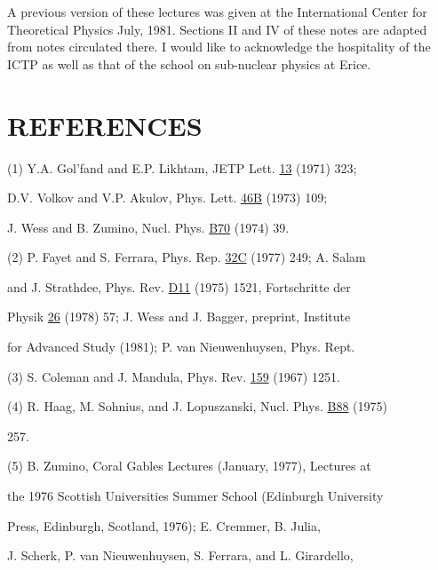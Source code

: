 A previous version of these lectures was given at the International
Center for Theoretical Physics July, 1981. Sections II and
IV of these notes are adapted from notes circulated there. I would
like to acknowledge the hospitality of the ICTP as well as that of
the school on sub-nuclear physics at Erice.

\section{REFERENCES}

(1) Y.A. Gol'fand and E.P. Likhtam, JETP Lett. \underline{13} (1971) 323;

\hspace*{1.6em} D.V. Volkov and V.P. Akulov, Phys. Lett. \underline{46B} (1973) 109;

\hspace*{1.6em} J. Wess and B. Zumino, Nucl. Phys. \underline{B70} (1974) 39.

(2) P. Fayet and S. Ferrara, Phys. Rep. \underline{32C} (1977) 249; A. Salam

\hspace*{1.6em} and J. Strathdee, Phys. Rev. \underline{D11} (1975) 1521, Fortschritte der

\hspace*{1.6em} Physik \underline{26} (1978) 57; J. Wess and J. Bagger, preprint, Institute

\hspace*{1.6em} for Advanced Study (1981); P. van Nieuwenhuysen, Phys. Rept.

(3) S. Coleman and J. Mandula, Phys. Rev. \underline{159} (1967) 1251.

(4) R. Haag, M. Sohnius, and J. Lopuszanski, Nucl. Phys. \underline{B88} (1975)

\hspace*{1.6em} 257.

(5) B. Zumino, Coral Gables Lectures (January, 1977), Lectures at

\hspace*{1.6em} the 1976 Scottish Universities Summer School (Edinburgh University

\hspace*{1.6em} Press, Edinburgh, Scotland, 1976); E. Cremmer, B. Julia,

\hspace*{1.6em} J. Scherk, P. van Nieuwenhuysen, S. Ferrara, and L. Girardello,

